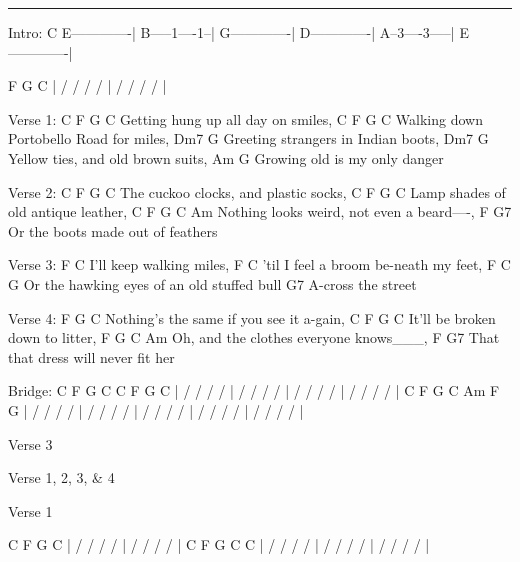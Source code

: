 \noindent\rule{\columnwidth}{1pt}

\begin{multicols}{2}
\begin{lsttab}
Intro:
    C
 E-------------|
 B-----1----1--|
 G-------------|
 D-------------|
 A--3----3-----|
 E-------------|   

  F     G      C       
| /  /  /  / | /  /  /  / | 
\end{lsttab}

\begin{lstsong}
Verse 1:
   C         F       G       C
Getting hung up all day on smiles,
   C           F         G         C
Walking down Portobello Road for miles,
           Dm7         G
Greeting strangers in Indian boots,
  Dm7             G        
Yellow ties, and old brown suits,
   Am              G 
Growing old is my only danger 

Verse 2:
       C      F           G      C
The cuckoo clocks, and plastic socks,
  C             F     G       C
Lamp shades of old antique leather,
   C            F         G      C   Am
Nothing looks weird, not even a beard----,
 F                G7
Or the boots made out of feathers

Verse 3:
 F           C
I'll keep walking miles, 
         F               C
'til I feel a broom be-neath my feet,
F         C                G
Or the hawking eyes of an old stuffed bull
    G7
A-cross the street
\end{lstsong}
\columnbreak
\begin{lstsong}










Verse 4:
                F          G        C
Nothing's the same if you see it a-gain,
   C       F      G        C
It'll be broken down to litter,
               F       G       C   Am
Oh, and the clothes everyone knows___,
 F                    G7
That that dress will never fit her

Bridge:
  C   F     G   C     C   F     G   C
| / / / / | / / / / | / / / / | / / / / |
  C   F     G   C     Am  F     G
| / / / / | / / / / | / / / / | / / / / | / / / / |
  
Verse 3

Verse 1, 2, 3, \& 4

Verse 1

  C   F     G   C     
| / / / / | / / / / |
  C   F     G   C         C
| / / / / | / / / / | / / / / |
\end{lstsong}
\end{multicols}
\newpage


